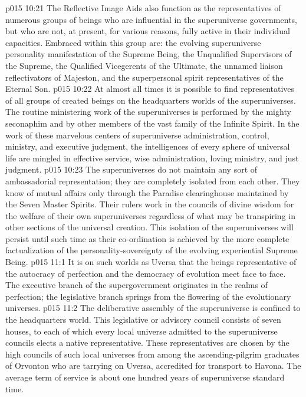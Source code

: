 \vs p015 10:21 \pc The Reflective Image Aids also function as the representatives of numerous groups of beings who are influential in the superuniverse governments, but who are not, at present, for various reasons, fully active in their individual capacities. Embraced within this group are: the evolving superuniverse personality manifestation of the Supreme Being, the Unqualified Supervisors of the Supreme, the Qualified Vicegerents of the Ultimate, the unnamed liaison reflectivators of Majeston, and the superpersonal spirit representatives of the Eternal Son.
\vs p015 10:22 \pc At almost all times it is possible to find representatives of all groups of created beings on the headquarters worlds of the superuniverses. The routine ministering work of the superuniverses is performed by the mighty seconaphim and by other members of the vast family of the Infinite Spirit. In the work of these marvelous centers of superuniverse administration, control, ministry, and executive judgment, the intelligences of every sphere of universal life are mingled in effective service, wise administration, loving ministry, and just judgment.
\vs p015 10:23 The superuniverses do not maintain any sort of ambassadorial representation; they are completely isolated from each other. They know of mutual affairs only through the Paradise clearinghouse maintained by the Seven Master Spirits. Their rulers work in the councils of divine wisdom for the welfare of their own superuniverses regardless of what may be transpiring in other sections of the universal creation. This isolation of the superuniverses will persist until such time as their co\hyp{}ordination is achieved by the more complete factualization of the personality\hyp{}sovereignty of the evolving experiential Supreme Being.
\vs p015 11:1 It is on such worlds as Uversa that the beings representative of the autocracy of perfection and the democracy of evolution meet face to face. The executive branch of the supergovernment originates in the realms of perfection; the legislative branch springs from the flowering of the evolutionary universes.
\vs p015 11:2 The deliberative assembly of the superuniverse is confined to the headquarters world. This legislative or advisory council consists of seven houses, to each of which every local universe admitted to the superuniverse councils elects a native representative. These representatives are chosen by the high councils of such local universes from among the ascending\hyp{}pilgrim graduates of Orvonton who are tarrying on Uversa, accredited for transport to Havona. The average term of service is about one hundred years of superuniverse standard time.

